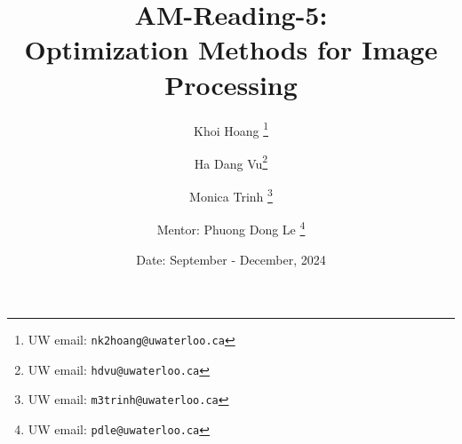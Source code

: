 \documentclass[a4paper]{article}
\begin{document}
\title{ AM-Reading-5: \\  Optimization Methods for Image Processing}

\author{Khoi Hoang %
  \thanks{UW email: \texttt{nk2hoang@uwaterloo.ca}} \and Ha Dang Vu\thanks{UW email: \texttt{hdvu@uwaterloo.ca}}   \and Monica Trinh \thanks{UW email: \texttt{m3trinh@uwaterloo.ca}} }
\affil{}

\author{Mentor: Phuong Dong Le%
  \thanks{UW email: \texttt{pdle@uwaterloo.ca}}}

\date{Date: September - December, 2024}

\maketitle
\end{document}

